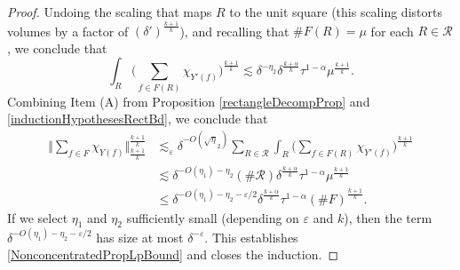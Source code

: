 \documentclass[10pt,a4paper]{amsart}
\newcommand{\eps}{\varepsilon}
\begin{document}
\begin{proof}
Undoing the scaling that maps $R$ to the unit square (this scaling distorts volumes by a factor of $(\delta')^{\frac{k+1}{k}}$), and recalling that $\#F(R)=\mu$ for each $R\in\mathcal{R}$, we conclude that
\begin{equation}\label{inductionHypothesesRectBd}
\int_R \Big( \sum_{f\in  F(R) }\chi_{Y'(f)}  \Big)^{\frac{k+1}{k}} \lesssim 
 \delta^{-\eta_2}\delta^{\frac{k+\alpha}{k}}\tau^{1-\alpha} \mu^{\frac{k+1}{k}}.
\end{equation}
Combining Item (A) from Proposition \ref{rectangleDecompProp} and \eqref{inductionHypothesesRectBd}, we conclude that 
%
\begin{equation}\label{controlOFLkNormInductionClose}
\begin{split}
\Big \Vert \sum_{f\in F}\chi_{Y(f)}\Big\Vert_{\frac{k+1}{k}}^{\frac{k+1}{k}} & \lesssim_\eps \delta^{-O(\sqrt\eta_2)}\sum_{R\in\mathcal{R}} \int_{R}\Big(\sum_{f\in F(R)}\chi_{Y'(f)}\Big)^{\frac{k+1}{k}}\\
& \lesssim  \delta^{-O(\eta_1)-\eta_2}(\#\mathcal{R})\delta^{\frac{k+\alpha}{k}}\tau^{1-\alpha} \mu^{\frac{k+1}{k}}\\
& \leq \delta^{-O(\eta_1)-\eta_2-\eps/2}\delta^{\frac{k+\alpha}{k}}\tau^{1-\alpha} (\# F)^{\frac{k+1}{k}}.
\end{split}
\end{equation} 
If we select $\eta_1$ and $\eta_2$ sufficiently small (depending on $\eps$ and $k$), then the term $\delta^{-O(\eta_1)-\eta_2-\eps/2}$ has size at most $\delta^{-\eps}$. This establishes \eqref{NonconcentratedPropLpBound} and closes the induction. 
\end{proof}
\end{document}
